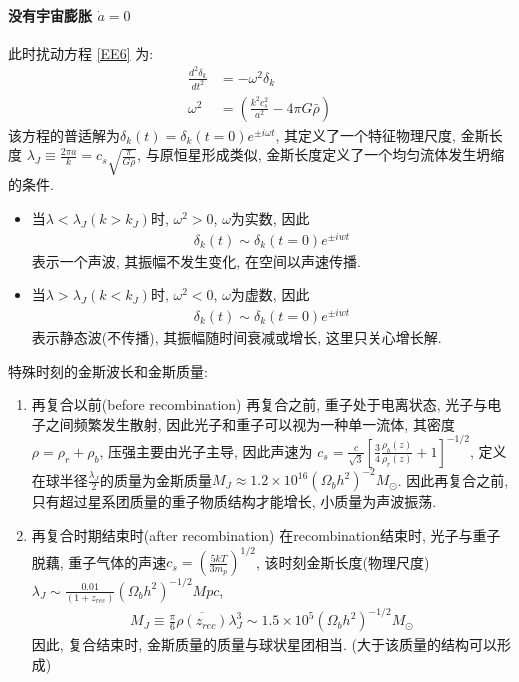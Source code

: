 \paragraph{没有宇宙膨胀 \texorpdfstring{$\dot{a}=0$}.}
此时扰动方程 \ref{EE6} 为:
\begin{align*}
    \frac{d^2\delta_k}{d t^2}&=-\omega^2\delta_k\\
    \omega^2&=\left( \frac{k^2 c_s^2}{a^2}-4\pi G\bar{\rho} \right)
\end{align*}
该方程的普适解为$\delta_k(t)=\delta_k(t=0)e^{\pm i\omega t}$, 其定义了一个特征物理尺度, 金斯长度 $\lambda_J\equiv \frac{2\pi a}{k}=c_s\sqrt{\frac{\pi}{G\bar{\rho}}}$, 与原恒星形成类似, 金斯长度定义了一个均匀流体发生坍缩的条件. 
\begin{itemize}\small
    \item 当$\lambda<\lambda_J(k>k_J)$时, $\omega^2>0$, $\omega$为实数, 因此
    \begin{align*}
        \delta_k(t)\sim\delta_k(t=0)e^{\pm iwt}
    \end{align*}
    表示一个声波, 其振幅不发生变化, 在空间以声速传播. 
    \item 当$\lambda>\lambda_J(k<k_J)$时, $\omega^2<0$, $\omega$为虚数, 因此
    \begin{align*}
        \delta_k(t)\sim\delta_k(t=0)e^{\pm iwt}
    \end{align*}
    表示静态波(不传播), 其振幅随时间衰减或增长, 这里只关心增长解. 
\end{itemize}

特殊时刻的金斯波长和金斯质量:
\begin{enumerate}
    \item 再复合以前(before recombination)
    \subitem 再复合之前, 重子处于电离状态, 光子与电子之间频繁发生散射, 因此光子和重子可以视为一种单一流体, 其密度$\rho=\rho_r+\rho_b$, 压强主要由光子主导, 因此声速为 $\displaystyle c_s=\frac{c}{\sqrt{3}}\left[ \frac{3}{4}\frac{\rho_b(z)}{\rho_r(z)}+1 \right]^{-1/2} $, 定义在球半径$\displaystyle\frac{\lambda_J}{2}$的质量为金斯质量$M_J\approx 1.2\times 10^{16}(\Omega_b h^2)^{-2}M_{\odot}$. 因此再复合之前, 只有超过星系团质量的重子物质结构才能增长, 小质量为声波振荡. 
    \item 再复合时期结束时(after recombination)
    \subitem 在recombination结束时, 光子与重子脱藕, 重子气体的声速$\displaystyle c_s=\left( \frac{5kT}{3m_p} \right)^{1/2}$, 该时刻金斯长度(物理尺度)$\displaystyle \lambda_J\sim\frac{0.01}{(1+z_{rec})}(\Omega_b h^2)^{-1/2}Mpc$, 
    \begin{align*}
        M_J\equiv \frac{\pi}{6}\overline{\rho(z_{rec})}\lambda_J^3\sim 1.5\times 10^5(\Omega_b h^2)^{-1/2}M_{\odot}
    \end{align*}
    因此, 复合结束时, 金斯质量的质量与球状星团相当. (大于该质量的结构可以形成)
\end{enumerate}

